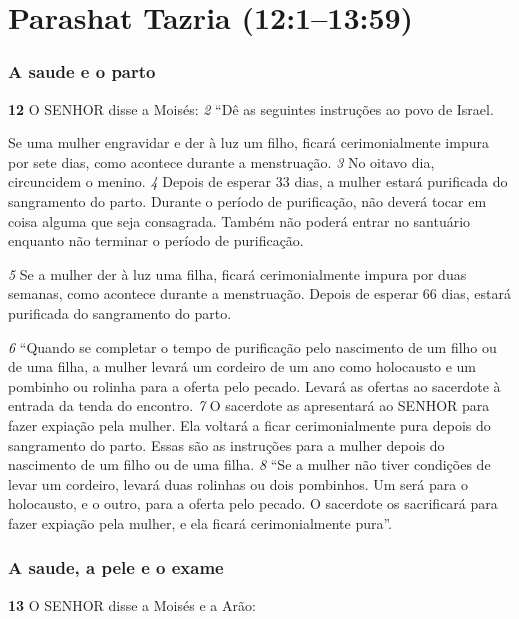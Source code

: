 \section*{Parashat Tazria (12:1–13:59)}

\subsubsection*{A saude e o parto}
   
\textbf{\large 12}
 O SENHOR disse a Moisés: 
\textit{\tiny 2} 
“Dê as seguintes instruções ao povo de Israel. 

\smallskip
Se uma mulher engravidar e der à luz um filho, ficará cerimonialmente impura por
sete dias, como acontece durante a menstruação. 
\textit{\tiny 3} 
No oitavo dia, circuncidem o
menino. 
\textit{\tiny 4} 
Depois de esperar 33 dias, a mulher estará purificada do sangramento
do parto. Durante o período de purificação, não deverá tocar em coisa alguma que
seja consagrada. Também não poderá entrar no santuário enquanto não terminar
o período de purificação. 

\smallskip
\textit{\tiny 5} 
Se a mulher der à luz uma filha, ficará
cerimonialmente impura por duas semanas, como acontece durante a
menstruação. Depois de esperar 66 dias, estará purificada do sangramento do parto. 

\smallskip
\textit{\tiny 6} 
“Quando se completar o tempo de purificação pelo nascimento de um filho ou
de uma filha, a mulher levará um cordeiro de um ano como holocausto e um
pombinho ou rolinha para a oferta pelo pecado. Levará as ofertas ao sacerdote à
entrada da tenda do encontro. 
\textit{\tiny 7} 
O sacerdote as apresentará ao SENHOR para fazer
expiação pela mulher. Ela voltará a ficar cerimonialmente pura depois do
sangramento do parto. Essas são as instruções para a mulher depois do
nascimento de um filho ou de uma filha. 
\textit{\tiny 8} 
“Se a mulher não tiver condições de levar um cordeiro, levará duas rolinhas ou
dois pombinhos. Um será para o holocausto, e o outro, para a oferta pelo pecado.
O sacerdote os sacrificará para fazer expiação pela mulher, e ela ficará
cerimonialmente pura”.

  
\bigskip 
\subsubsection*{A saude, a pele e o exame}
\textbf{\large 13}
 O SENHOR disse a Moisés e a Arão: 

